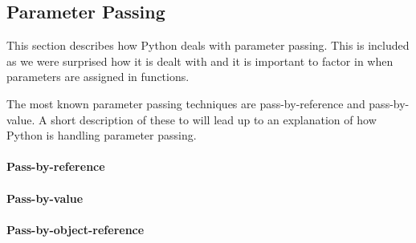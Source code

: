 \subsection{Parameter Passing}
This section describes how Python deals with parameter passing.
This is included as we were surprised how it is dealt with and it is important to factor in when parameters are assigned in functions.

The most known parameter passing techniques are pass-by-reference and pass-by-value.
A short description of these to will lead up to an explanation of how Python is handling parameter passing.

\paragraph{Pass-by-reference}
\paragraph{Pass-by-value}
\paragraph{Pass-by-object-reference}

